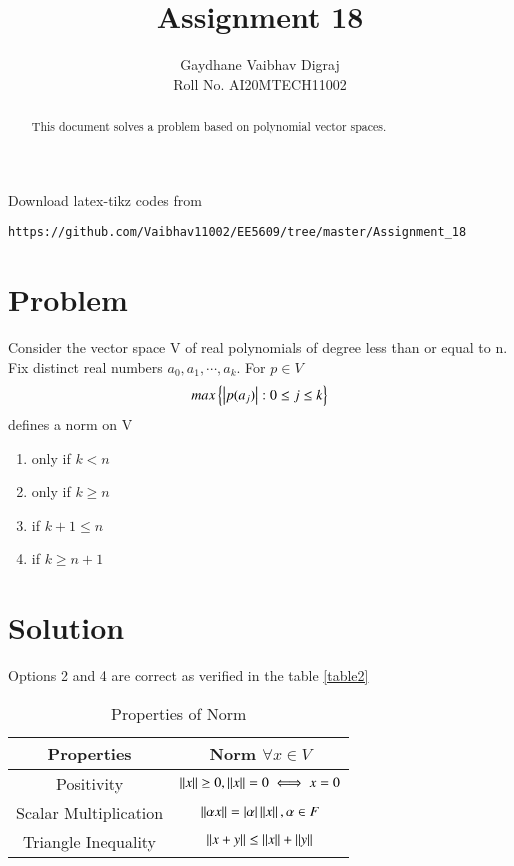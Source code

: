\documentclass[journal,12pt,twocolumn]{IEEEtran}
\begin{document}
     \def\rightbox#1{\makebox[0in][r]{#1}}
     \def\centbox#1{\makebox[0in]{#1}}
     \def\topbox#1{\raisebox{-\baselineskip}[0in][0in]{#1}}
     \def\midbox#1{\raisebox{-0.5\baselineskip}[0in][0in]{#1}}
\vspace{3cm}
\title{Assignment 18}
\author{Gaydhane Vaibhav Digraj \\ Roll No. AI20MTECH11002}
\maketitle
\newpage
\bigskip
\renewcommand{\thefigure}{\theenumi}
\renewcommand{\thetable}{\theenumi}
\begin{abstract}
This document solves a problem based on polynomial vector spaces.
\end{abstract}
%
Download latex-tikz codes from 
%
\begin{lstlisting}
https://github.com/Vaibhav11002/EE5609/tree/master/Assignment_18
\end{lstlisting}
%
\section{Problem}
Consider the vector space V of real polynomials of degree less than or equal to n. Fix distinct real numbers $a_0, a_1, \cdots, a_k$. For $p \in V$
\begin{align*}
    max\left\{\left\vert p(a_j)\right\vert: 0\leq j \leq k\right\}
\end{align*}
defines a norm on V
\begin{enumerate}
    \item only if $k<n$
    \item only if $k\ge n$
    \item if $ k+1\leq n$ 
    \item if $k \ge n+1$
\end{enumerate}

\section{Solution}
Options 2 and 4 are correct as verified in the table \ref{table2}
\renewcommand{\thetable}{1}
\begin{table*}[ht!]
\begin{center}
\begin{tabular}{|c|c|}
\hline
\textbf{Properties}&\textbf{Norm $\forall x \in V$}\\
\hline
Positivity & $\left\lVert x\right\rVert\ge 0, \left\lVert x\right\rVert = 0 \iff x=0 $ \\
\hline
Scalar Multiplication & $\left\lVert\alpha x\right\rVert = \left\vert\alpha\right\vert\left\lVert x\right\rVert, \alpha \in F $\\
\hline
Triangle Inequality & $\left\lVert x+y\right\rVert \le \left\lVert x\right\rVert + \left\lVert y\right\rVert $\\
\hline
\end{tabular}
\caption{Properties of Norm}
\label{table1}
\end{center}
\end{table*}
\end{document}
